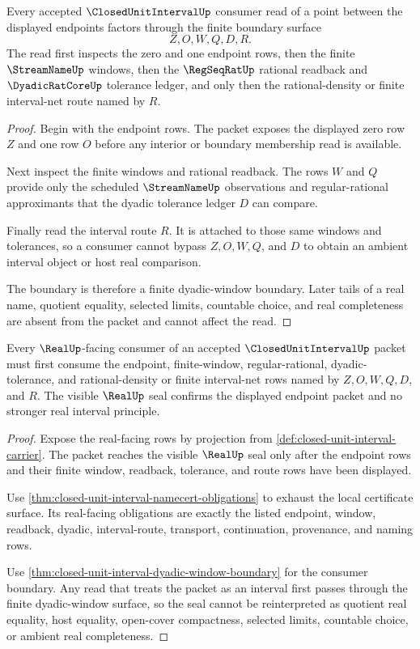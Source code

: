 \begin{theorem}
\label{thm:closed-unit-interval-dyadic-window-boundary}
Every accepted $\ClosedUnitIntervalUp$ consumer read of a point between the displayed endpoints factors through the finite boundary surface
$$
Z,O,W,Q,D,R.
$$
The read first inspects the zero and one endpoint rows, then the finite $\StreamNameUp$ windows, then the $\RegSeqRatUp$ rational readback and $\DyadicRatCoreUp$ tolerance ledger, and only then the rational-density or finite interval-net route named by $R$.
\end{theorem}
\begin{proof}
Begin with the endpoint rows. The packet exposes the displayed zero row $Z$ and one row $O$ before any interior or boundary membership read is available.

Next inspect the finite windows and rational readback. The rows $W$ and $Q$ provide only the scheduled $\StreamNameUp$ observations and regular-rational approximants that the dyadic tolerance ledger $D$ can compare.

Finally read the interval route $R$. It is attached to those same windows and tolerances, so a consumer cannot bypass $Z,O,W,Q$, and $D$ to obtain an ambient interval object or host real comparison.

The boundary is therefore a finite dyadic-window boundary. Later tails of a real name, quotient equality, selected limits, countable choice, and real completeness are absent from the packet and cannot affect the read.
\end{proof}

\begin{theorem}
\label{thm:closed-unit-interval-real-seal-scope}
Every $\RealUp$-facing consumer of an accepted $\ClosedUnitIntervalUp$ packet must first consume the endpoint, finite-window, regular-rational, dyadic-tolerance, and rational-density or finite interval-net rows named by $Z,O,W,Q,D$, and $R$. The visible $\RealUp$ seal confirms the displayed endpoint packet and no stronger real interval principle.
\end{theorem}
\begin{proof}
Expose the real-facing rows by projection from \autoref{def:closed-unit-interval-carrier}. The packet reaches the visible $\RealUp$ seal only after the endpoint rows and their finite window, readback, tolerance, and route rows have been displayed.

Use \autoref{thm:closed-unit-interval-namecert-obligations} to exhaust the local certificate surface. Its real-facing obligations are exactly the listed endpoint, window, readback, dyadic, interval-route, transport, continuation, provenance, and naming rows.

Use \autoref{thm:closed-unit-interval-dyadic-window-boundary} for the consumer boundary. Any read that treats the packet as an interval first passes through the finite dyadic-window surface, so the seal cannot be reinterpreted as quotient real equality, host equality, open-cover compactness, selected limits, countable choice, or ambient real completeness.
\end{proof}

